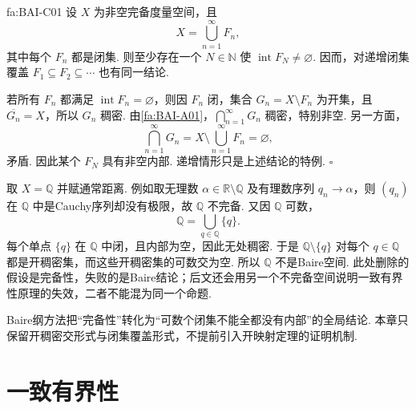 \begin{FAProposition}[C][闭集覆盖的内部原则]{fa:BAI-C01}
设 \(\displaystyle X\) 为非空完备度量空间，且
\[
X=\bigcup_{n=1}^{\infty}F_n,
\]
其中每个 \(\displaystyle F_n\) 都是闭集. 则至少存在一个 \(\displaystyle N\in\mathbb N\) 使 \(\displaystyle \operatorname{int}F_N\neq\varnothing\). 因而，对递增闭集覆盖 \(\displaystyle F_1\subseteq F_2\subseteq\cdots\) 也有同一结论.
\end{FAProposition}

\begin{FAProof}
若所有 \(\displaystyle F_n\) 都满足 \(\displaystyle \operatorname{int}F_n=\varnothing\)，则因 \(\displaystyle F_n\) 闭，集合 \(\displaystyle G_n=X\setminus F_n\) 为开集，且 \(\displaystyle \overline{G_n}=X\)，所以 \(\displaystyle G_n\) 稠密. 由\autoref{fa:BAI-A01}，\(\displaystyle \bigcap_{n=1}^{\infty}G_n\) 稠密，特别非空. 另一方面，
\[
\bigcap_{n=1}^{\infty}G_n
=X\setminus\bigcup_{n=1}^{\infty}F_n
=\varnothing,
\]
矛盾. 因此某个 \(\displaystyle F_N\) 具有非空内部. 递增情形只是上述结论的特例.
\hfill\(\square\)
\end{FAProof}

\begin{FACounterexample}[不完备空间可失去Baire结论]\label{i08:ce-incomplete-baire}
取 \(\displaystyle X=\mathbb Q\) 并赋通常距离. 例如取无理数 \(\displaystyle \alpha\in\mathbb R\setminus\mathbb Q\) 及有理数序列 \(\displaystyle q_n\to\alpha\)，则 \(\displaystyle (q_n)\) 在 \(\displaystyle \mathbb Q\) 中是Cauchy序列却没有极限，故 \(\displaystyle \mathbb Q\) 不完备. 又因 \(\displaystyle \mathbb Q\) 可数，
\[
\mathbb Q=\bigcup_{q\in\mathbb Q}\{q\}.
\]
每个单点 \(\displaystyle \{q\}\) 在 \(\displaystyle \mathbb Q\) 中闭，且内部为空，因此无处稠密. 于是 \(\displaystyle \mathbb Q\setminus\{q\}\) 对每个 \(\displaystyle q\in\mathbb Q\) 都是开稠密集，而这些开稠密集的可数交为空. 所以 \(\displaystyle \mathbb Q\) 不是Baire空间. 此处删除的假设是完备性，失败的是Baire结论；后文还会用另一个不完备空间说明一致有界性原理的失效，二者不能混为同一个命题.
\end{FACounterexample}

\begin{FARemark}[历史术语]
Baire纲方法把“完备性”转化为“可数个闭集不能全都没有内部”的全局结论. 本章只保留开稠密交形式与闭集覆盖形式，不提前引入开映射定理的证明机制.
\end{FARemark}

\section{一致有界性}\label{sec:i08-ubp}

